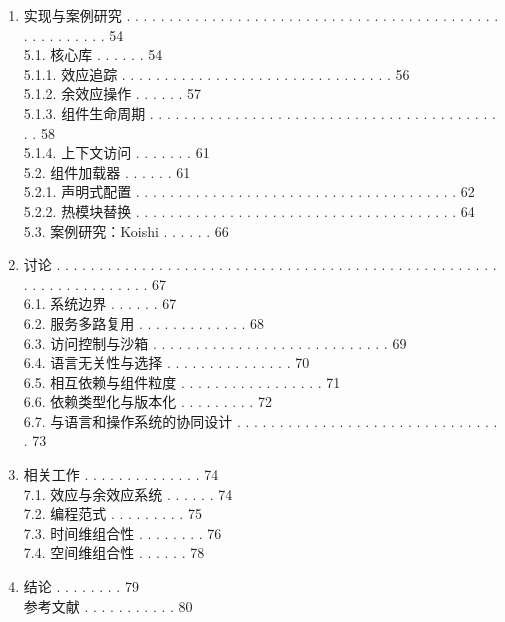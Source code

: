 \begin{enumerate}
  . . . . . . . . . . . . . . . . . . . . . . . . . . 45\\
  4.4.4. 进展 . . . . . 47\\
  4.4.5. 汇合 . . . . . . . . . . . . . . 49\\
\item
  实现与案例研究 . . . . . . . . . . . . . . . . . . . .
  . . . . . . . . . . . . . . . . . . . . . . . . . . . . . . . . . .
  54\\
  5.1. 核心库 . . . . . . 54\\
  5.1.1. 效应追踪 . . . . . . . . . . . . . . . . . . . . . . . .
  . . . . . . . . 56\\
  5.1.2. 余效应操作 . . . . . . 57\\
  5.1.3. 组件生命周期 . . . . . . . . . . . . . . . . . . . . . .
  . . . . . . . . . . . . . . . . . . . . . 58\\
  5.1.4. 上下文访问 . . . . . . . 61\\
  5.2. 组件加载器 . . . . . . 61\\
  5.2.1. 声明式配置 . . . . . . . . . . . . . . . . . . .
  . . . . . . . . . . . . . . . . . . . 62\\
  5.2.2. 热模块替换 . . . . . . . . . . . . . . . . . . . .
  . . . . . . . . . . . . . . . . . . 64\\
  5.3. 案例研究：Koishi . . . . . . 66\\
\item
  讨论 . . . . . . . . . . . . . . . . . . . . . . . . . . . . . .
  . . . . . . . . . . . . . . . . . . . . . . . . . . . . . . . . . . .
  . . 67\\
  6.1. 系统边界 . . . . . . 67\\
  6.2. 服务多路复用 . . . . . . . . . . . . . 68\\
  6.3. 访问控制与沙箱 . . . . . . . . . . . . . . . . . .
  . . . . . . . . . . 69\\
  6.4. 语言无关性与选择 . . . . . . . . . . . . . . .
  70\\
  6.5. 相互依赖与组件粒度 . . . . . . . . . .
  . . . . . . . 71\\
  6.6. 依赖类型化与版本化 . . . . . . . . . 72\\
  6.7. 与语言和操作系统的协同设计 . . . . . . . . .
  . . . . . . . . . . . . . . . . . . . . . . . 73\\
\item
  相关工作 . . . . . . . . . . . . . . 74\\
  7.1. 效应与余效应系统 . . . . . . 74\\
  7.2. 编程范式 . . . . . . . . . 75\\
  7.3. 时间维组合性 . . . . . . . . 76\\
  7.4. 空间维组合性 . . . . . . 78\\
\item
  结论 . . . . . . . . 79\\
  参考文献 . . . . . . . . . . . 80
\end{enumerate}


